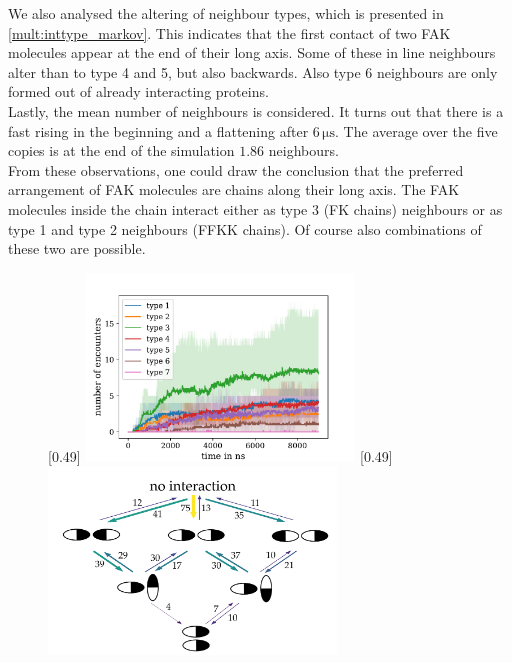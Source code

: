 We also analysed the altering of neighbour types, which is presented in \autoref{mult:inttype_markov}. This indicates that the first contact of two FAK molecules appear at the end of their long axis. Some of these in line neighbours alter than to type 4 and 5, but also backwards. Also type 6 neighbours are only formed out of already interacting proteins.\\
Lastly, the mean number of neighbours is considered. It turns out that there is a fast rising in the beginning and a flattening after $6\,\si{\micro\second}$. The average over the five copies is at the end of the simulation $1.86$ neighbours.\\
From these observations, one could draw the conclusion that the preferred arrangement of FAK molecules are chains along their long axis. The FAK molecules inside the chain interact either as type 3 (FK chains) neighbours or as type 1 and type 2 neighbours (FFKK chains). Of course also combinations of these two are possible.
%
%
%
\begin{figure}
	\subcaptionbox{\label{mult:inttype_vs_t}}[0.49\textwidth]{
		\includegraphics[height=5cm]{figures/results/multiple_typevstime}
	}\hfill%
	\subcaptionbox{\label{mult:inttype_markov}}[0.49\textwidth]{
		\includegraphics[height=5cm]{figures/results/markov}
	}%
\end{figure}
%
%
%
